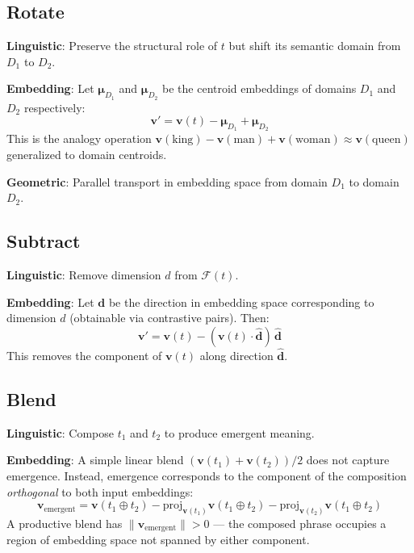 \documentclass[11pt,a4paper]{article}
\begin{document}
\subsection{Rotate}

\textbf{Linguistic}: Preserve the structural role of $t$ but shift its semantic
domain from $D_1$ to $D_2$.

\textbf{Embedding}: Let $\boldsymbol{\mu}_{D_1}$ and $\boldsymbol{\mu}_{D_2}$ be
the centroid embeddings of domains $D_1$ and $D_2$ respectively:
\[
  \mathbf{v}' = \mathbf{v}(t) - \boldsymbol{\mu}_{D_1} + \boldsymbol{\mu}_{D_2}
\]
This is the analogy operation $\mathbf{v}(\text{king}) - \mathbf{v}(\text{man})
+ \mathbf{v}(\text{woman}) \approx \mathbf{v}(\text{queen})$
\cite{mikolov2013} generalized to domain centroids.

\textbf{Geometric}: Parallel transport in embedding space from domain $D_1$
to domain $D_2$.

\subsection{Subtract}

\textbf{Linguistic}: Remove dimension $d$ from $\mathcal{F}(t)$.

\textbf{Embedding}: Let $\mathbf{d}$ be the direction in embedding space
corresponding to dimension $d$ (obtainable via contrastive pairs). Then:
\[
  \mathbf{v}' = \mathbf{v}(t) - (\mathbf{v}(t) \cdot \hat{\mathbf{d}})\,\hat{\mathbf{d}}
\]
This removes the component of $\mathbf{v}(t)$ along direction $\hat{\mathbf{d}}$.

\subsection{Blend}

\textbf{Linguistic}: Compose $t_1$ and $t_2$ to produce emergent meaning.

\textbf{Embedding}: A simple linear blend $(\mathbf{v}(t_1) + \mathbf{v}(t_2)) / 2$
does not capture emergence. Instead, emergence corresponds to the component of
the composition \textit{orthogonal} to both input embeddings:
\[
  \mathbf{v}_\text{emergent}
  = \mathbf{v}(t_1 \oplus t_2)
    - \text{proj}_{\mathbf{v}(t_1)} \mathbf{v}(t_1 \oplus t_2)
    - \text{proj}_{\mathbf{v}(t_2)} \mathbf{v}(t_1 \oplus t_2)
\]
A productive blend has $\|\mathbf{v}_\text{emergent}\| > 0$ — the composed
phrase occupies a region of embedding space not spanned by either component.
\end{document}
